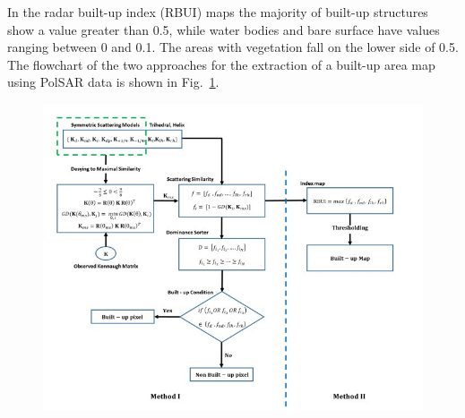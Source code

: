 \documentclass[paper=a4, fontsize=11pt]{scrartcl}
\begin{document}
In the radar built-up index (RBUI) maps the majority of built-up structures show a value greater than 0.5, while water bodies and bare surface have values ranging between 0 and 0.1.
The areas with vegetation fall on the lower side of 0.5. 
The flowchart of the two approaches for the extraction of a built-up area map using PolSAR data is shown in Fig.~\ref{Fig:Flowchart}.

\begin{figure}[hbt]
	\centering
	\includegraphics[width=0.5\linewidth]{Figures/Flowchart.jpg}
	\label{Fig:Flowchart}
\end{figure}
\end{document}
